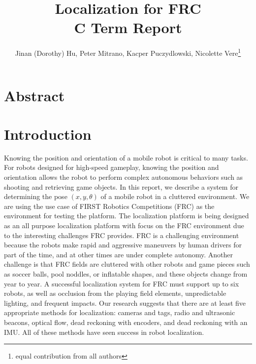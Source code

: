 \documentclass{article}
\begin{document}
\title{Localization for FRC \\[0,4em]
  \large{C Term Report}
  }
\author{Jinan (Dorothy) Hu, Peter Mitrano, Kacper Puczydlowski, Nicolette Vere\thanks{equal contribution from all authors}}

\maketitle{}

\section{Abstract}


\section{Introduction}

  Knowing the position and orientation of a mobile robot is critical to many tasks. For robots designed for high-speed gameplay, knowing the position and orientation allows the robot to perform complex autonomous behaviors such as shooting and retrieving game objects. In this report, we describe a system for determining the pose $(x, y, \theta)$ of a mobile robot in a cluttered environment. We are using the use case of FIRST Robotics Competitions (FRC) as the environment for testing the platform. The localization platform is being designed as an all purpose localization platform with focus on the FRC environment due to the interesting challenges FRC provides. FRC is a challenging environment because the robots make rapid and aggressive maneuvers by human drivers for part of the time, and at other times are under complete autonomy. Another challenge is that FRC fields are cluttered with other robots and game pieces such as soccer balls, pool noddles, or inflatable shapes, and these objects change from year to year. A successful localization system for FRC must support up to six robots, as well as occlusion from the playing field elements, unpredictable lighting, and frequent impacts. Our research suggests that there are at least five appropriate methods for localization: cameras and tags, radio and ultrasonic beacons, optical flow, dead reckoning with encoders, and dead reckoning with an IMU. All of these methods have seen success in robot localization.
\end{document}
